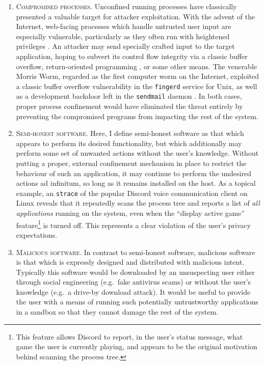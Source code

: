 \documentclass[dvipsnames, 12pt]{article}
\begin{document}
\begin{enumerate}[label=\bfseries A\arabic*., ref=A\arabic*, labelindent=2em]
    \item \label{a:1} \textsc{Compromised processes.} Unconfined running
    processes have classically presented a valuable target for attacker
    exploitation. With the advent of the Internet, web-facing processes which
    handle untrusted user input are especially vulnerable, particularly as they
    often run with heightened privileges \cite{cohen1996_secure}. An attacker
    may send specially crafted input to the target application, hoping to
    subvert its control flow integrity via a classic buffer overflow,
    return-oriented programming \cite{shacham2007_rop}, or some other means. The
    venerable Morris Worm, regarded as the first computer worm on the Internet,
    exploited a classic buffer overflow vulnerability in the \texttt{fingerd}
    service for Unix, as well as a development backdoor left in the
    \texttt{sendmail} daemon \cite{spafford1989_morris}. In both cases, proper
    process confinement would have eliminated the threat entirely by preventing
    the compromised programs from impacting the rest of the system.

    \item \label{a:2} \textsc{Semi-honest software.} Here, I define semi-honest
    software as that which appears to perform its desired functionality, but
    which additionally may perform some set of unwanted actions without the
    user's knowledge. Without putting a proper, external confinement mechanism
    in place to restrict the behaviour of such an application, it may continue
    to perform the undesired actions ad infinitum, so long as it remains
    installed on the host. As a topical example, an \texttt{strace} of the
    popular Discord \cite{discord} voice communication client on Linux reveals
    that it repeatedly scans the process tree and reports a list of \textit{all
    applications} running on the system, even when the \enquote{display active
    game} feature\footnote{This feature allows Discord to report, in the user's
    status message, what game the user is currently playing, and appears to be
    the original motivation behind scanning the process tree.} is turned off.
    This represents a clear violation of the user's privacy expectations.

    \item \label{a:3} \textsc{Malicious software.} In contrast to semi-honest
    software, malicious software is that which is expressly designed and
    distributed with malicious intent. Typically this software would be
    downloaded by an unsuspecting user either through social engineering
    (e.g.~fake antivirus scams) or without the user's knowledge (e.g.~a drive-by
    download attack). It would be useful to provide the user with a means of
    running such potentially untrustworthy applications in a sandbox so that
    they cannot damage the rest of the system.
\end{enumerate}
\end{document}
